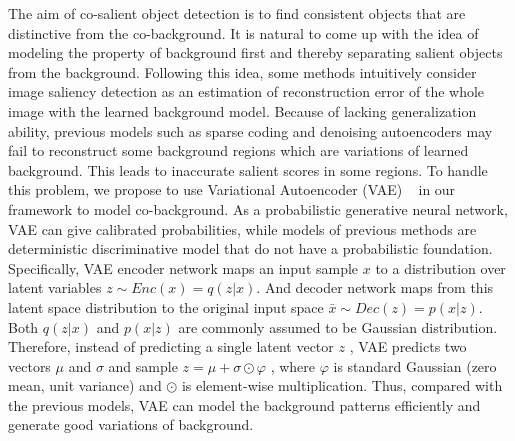 \documentclass[sigconf]{acmart}
\begin{document}
\noindent The aim of co-salient object detection is to find consistent objects that are distinctive from the co-background. It is natural to come up with the idea of modeling the property of background first and thereby separating salient objects from the background. Following this idea, some methods \cite{Lu2016,Han2015} intuitively consider image saliency detection as an estimation of reconstruction error of the whole image with the learned background model. Because of lacking generalization ability, previous models such as sparse coding and denoising autoencoders \cite{Lu2016,Han2015} may fail to reconstruct some background regions which are variations of learned background. This leads to inaccurate salient scores in some regions. To handle this problem, we propose to use Variational Autoencoder (VAE) ~\cite{DBLP:journals/corr/KingmaW13} in our framework to model co-background.  As a probabilistic generative neural network, VAE can give calibrated probabilities, while models of previous methods are deterministic discriminative model that do not have a probabilistic foundation.
Specifically, VAE encoder network maps an input sample $x$ to a distribution over latent variables $ z \sim Enc(x) =
q(z|x)$.  And decoder network maps from this latent space distribution to  the original input space $\bar{x} \sim Dec(z) = p(x|z)$. Both $q(z|x)$ and $p(x|z)$ are commonly assumed to be Gaussian distribution. Therefore, instead of predicting a single latent vector $z$ , VAE predicts two vectors $\mu$ and $\sigma$ and sample $z =\mu + \sigma \odot \varphi$ ,
where $\varphi$ is standard Gaussian (zero mean, unit variance) and $\odot$ is element-wise multiplication. Thus, compared with the previous models, VAE can model the background patterns efficiently and generate good variations of background.
\end{document}
